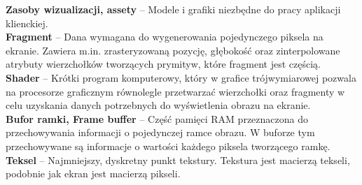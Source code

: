 \textbf{Zasoby wizualizacji, assety} -- Modele i grafiki niezbędne do pracy aplikacji klienckiej.\\

\textbf{Fragment} -- Dana wymagana do wygenerowania pojedynczego piksela na ekranie. Zawiera m.in. zrasteryzowaną pozycję, głębokość oraz zinterpolowane atrybuty wierzchołków tworzących prymityw, które fragment jest częścią.\\

\textbf{Shader} -- Krótki program komputerowy, który w grafice trójwymiarowej pozwala na procesorze graficznym równolegle przetwarzać wierzchołki oraz fragmenty w celu uzyskania danych potrzebnych do wyświetlenia obrazu na ekranie.\\

\textbf{Bufor ramki, Frame buffer} -- Część pamięci RAM przeznaczona do przechowywania informacji o pojedynczej ramce obrazu. W buforze tym przechowywane są informacje o wartości każdego piksela tworzącego ramkę. \\

\textbf{Teksel} -- Najmniejszy, dyskretny punkt tekstury. Tekstura jest macierzą tekseli, podobnie jak ekran jest macierzą pikseli.\\

